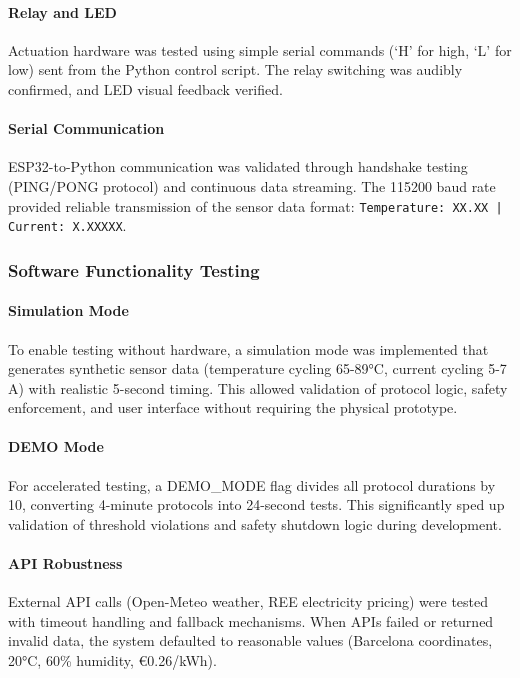 \documentclass[11pt,a4paper]{article}
\begin{document}
\paragraph{Relay and LED}
Actuation hardware was tested using simple serial commands (`H' for high, `L' for low) sent from the Python control script. The relay switching was audibly confirmed, and LED visual feedback verified.

\paragraph{Serial Communication}
ESP32-to-Python communication was validated through handshake testing (PING/PONG protocol) and continuous data streaming. The 115200 baud rate provided reliable transmission of the sensor data format: \texttt{Temperature: XX.XX | Current: X.XXXXX}.

\subsubsection*{Software Functionality Testing}

\paragraph{Simulation Mode}
To enable testing without hardware, a simulation mode was implemented that generates synthetic sensor data (temperature cycling 65-89°C, current cycling 5-7 A) with realistic 5-second timing. This allowed validation of protocol logic, safety enforcement, and user interface without requiring the physical prototype.

\paragraph{DEMO Mode}
For accelerated testing, a DEMO\_MODE flag divides all protocol durations by 10, converting 4-minute protocols into 24-second tests. This significantly sped up validation of threshold violations and safety shutdown logic during development.

\paragraph{API Robustness}
External API calls (Open-Meteo weather, REE electricity pricing) were tested with timeout handling and fallback mechanisms. When APIs failed or returned invalid data, the system defaulted to reasonable values (Barcelona coordinates, 20°C, 60\% humidity, €0.26/kWh).
\end{document}
